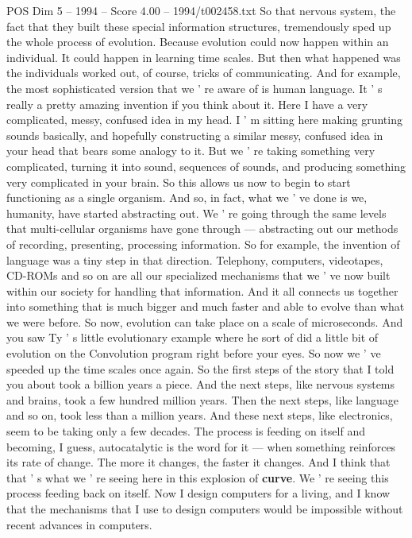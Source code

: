 \begin{textsample}{POS Dim 5 – 1994 – Score 4.00 – 1994/t002458.txt}
So that nervous system, the fact that they built these special information structures, tremendously sped up the whole process of evolution.
Because evolution could now happen within an individual.
It could happen in learning time scales.
But then what happened was the individuals worked out, of course, tricks of communicating.
And for example, the most sophisticated version that we ' re aware of is human language.
It ' s really a pretty amazing invention if you think about it.
Here I have a very complicated, messy, confused idea in my head.
I ' m sitting here making grunting sounds basically, and hopefully constructing a similar messy, confused idea in your head that bears some analogy to it.
But we ' re taking something very complicated, turning it into sound, sequences of sounds, and producing something very complicated in your brain.
So this allows us now to begin to start functioning as a single organism.
And so, in fact, what we ' ve done is we, humanity, have started abstracting out.
We ' re going through the same levels that multi-cellular organisms have gone through — abstracting out our methods of recording, presenting, processing information.
So for example, the invention of language was a tiny step in that direction.
Telephony, computers, videotapes, CD-ROMs and so on are all our specialized mechanisms that we ' ve now built within our society for handling that information.
And it all connects us together into something that is much bigger and much faster and able to evolve than what we were before.
So now, evolution can take place on a scale of microseconds.
And you saw Ty ' s little evolutionary example where he sort of did a little bit of evolution on the Convolution program right before your eyes.
So now we ' ve speeded up the time scales once again.
So the first steps of the story that I told you about took a billion years a piece.
And the next steps, like nervous systems and brains, took a few hundred million years.
Then the next steps, like language and so on, took less than a million years.
And these next steps, like electronics, seem to be taking only a few decades.
The process is feeding on itself and becoming, I guess, autocatalytic is the word for it — when something reinforces its rate of change.
The more it changes, the faster it changes.
And I think that that ' s what we ' re seeing here in this explosion of \textbf{curve}.
We ' re seeing this process feeding back on itself.
Now I design computers for a living, and I know that the mechanisms that I use to design computers would be impossible without recent advances in computers.

\end{textsample}

